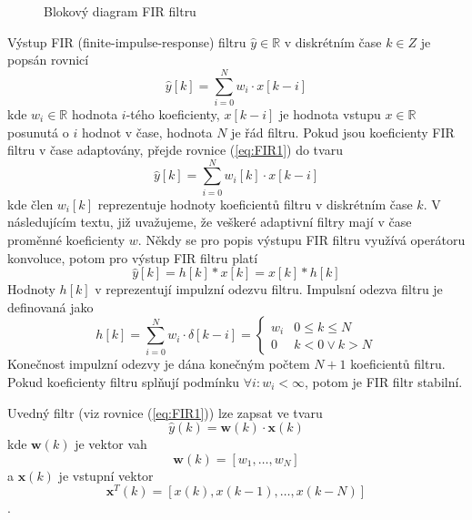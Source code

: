 \begin{figure}[h!]
    \caption{Blokový diagram FIR filtru}

\end{figure}
Výstup FIR (finite-impulse-response) filtru $\hat y \in \mathbb{R}$  v diskrétním čase  $k \in Z$  je popsán rovnicí
\begin{equation}\label{eq:FIR1}
    \hat{y}[k]=\sum_{i=0}^{N}w_i \cdot x[k-i] 
\end{equation}
kde $w_i \in \mathbb{R} $ hodnota $i$-tého koeficienty, $x[k-i] $ je hodnota vstupu $x \in \mathbb{R} $ posunutá o $i$ hodnot v čase, hodnota $N$ je řád filtru. Pokud jsou koeficienty FIR filtru v čase adaptovány, přejde rovnice (\ref{eq:FIR1}) do tvaru
\begin{equation}
    \hat{y}[k]=\sum_{i=0}^{N}w_i[k] \cdot x[k-i] 
\end{equation}
kde člen $w_i[k]$ reprezentuje hodnoty koeficientů filtru v diskrétním čase $k$. V následujícím textu, již uvažujeme, že veškeré adaptivní filtry mají v čase proměnné koeficienty $w$.
Někdy se pro popis výstupu FIR filtru využívá operátoru konvoluce, potom pro výstup FIR filtru platí
\begin{equation}
    \hat{y}[k]= h[k] * x[k]=x[k] * h[k]
\end{equation}
 Hodnoty $h[k]$ v reprezentují impulzní odezvu filtru. Impulsní odezva filtru je definovaná jako
 \begin{equation}
     h[k]=\sum_{i=0}^N w_i \cdot \delta[k-i]=
     \begin{cases}
     w_i & 0 \leq k \leq N \\
     0 & k < 0 \lor k > N 
     \end{cases}
 \end{equation}
 Konečnost impulzní odezvy je dána konečným počtem $N+1$ koeficientů filtru. Pokud koeficienty filtru splňují podmínku $\forall i: w_i < \infty$, potom je FIR filtr stabilní. 
 \par
 Uvedný filtr (viz rovnice (\ref{eq:FIR1})) lze zapsat ve tvaru
 \begin{equation}
     \hat{y}(k)= \textbf{w}(k)\cdot\textbf{x}(k)
 \end{equation}
kde $\textbf{w}(k)$ je vektor vah
\begin{equation}
    \textbf{w}(k)=[w_1,\dots, w_N]
\end{equation}
a $\textbf{x}(k)$ je vstupní vektor
\begin{equation}
    \textbf{x}^T(k)=[x(k),x(k-1),\dots,x(k-N)]
\end{equation}.


